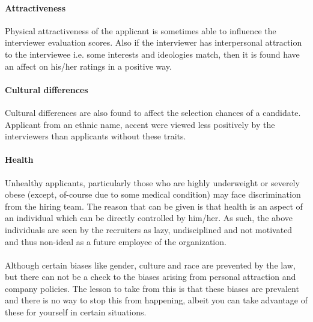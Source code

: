 \documentclass[a4paper,12pt]{report}
\begin{document}
\paragraph{Attractiveness}
Physical attractiveness of the applicant is sometimes able to influence the interviewer evaluation scores.
Also if the interviewer has interpersonal attraction\cite{interpersonal} to the interviewee i.e. some interests and ideologies match,
then it is found have an affect on his/her ratings in a positive way.
\paragraph{Cultural differences}
Cultural differences are also found to affect the selection chances of a candidate\cite{bias}. Applicant from 
an ethnic name, accent were viewed less positively by the interviewers than applicants without these traits.
\paragraph{Health}
Unhealthy applicants, particularly those who are highly underweight or severely obese (except, of-course due to some medical condition)
may face discrimination from the hiring team. The reason that can be given is that health is an aspect of an individual
 which can be directly controlled by him/her. As such, the above individuals are seen by the recruiters as lazy, undisciplined and
not motivated and thus non-ideal as a future employee of the organization.
\paragraph{}
Although certain biases like gender, culture and race are prevented by the law, but there can not be a check to the biases
arising from personal attraction and company policies.
The lesson to take from this is that these biases are prevalent and there is no way to stop this from happening,
albeit you can take advantage of these for yourself in certain situations.
\end{document}
